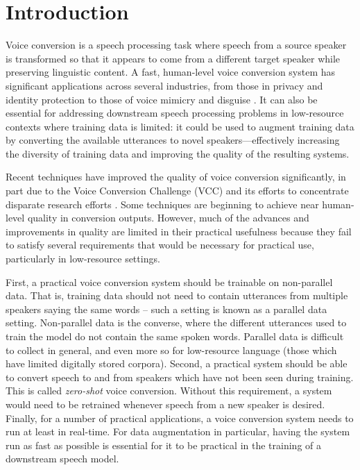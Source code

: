 \section{Introduction}
Voice conversion is a speech processing task where speech from a source speaker is transformed so that it appears to come from a different target speaker while preserving linguistic content.
A fast, human-level voice conversion
system has significant applications across several industries, from those in privacy and identity protection \cite{privacy} to those of voice mimicry and disguise \cite{vc_vc_spk_id,disguise}.
It can also be essential for addressing downstream speech processing problems in low-resource contexts where training data is limited:
it could be used to augment training data by converting the available utterances to novel speakers---effectively increasing the diversity of training data and improving the quality of the resulting systems.

Recent techniques have improved the quality of voice conversion significantly, in part due to the Voice Conversion Challenge (VCC) and its efforts to concentrate disparate research efforts \cite{vcc2020}. 
Some techniques are beginning to achieve near human-level quality in conversion outputs.
However, much of the advances and improvements in quality are limited in their practical usefulness because they fail to satisfy several requirements that would be necessary for practical use, particularly in low-resource settings.

First, a practical voice conversion system should be trainable on non-parallel data.
That is, training data should not need to contain utterances from multiple speakers saying the same words -- such a setting is known as a parallel data setting.
Non-parallel data is the converse, where the different utterances used to train the model do not contain the same spoken words.
Parallel data is difficult to collect in general, and even more so for low-resource language (those which have limited digitally stored corpora). 
Second, a practical system should be able to convert speech to and from speakers which have not been seen during training.
This is called \textit{zero-shot} voice conversion.
Without this requirement, a  system would need to be retrained whenever speech from a new speaker is desired.
Finally, for a number of practical applications, a voice conversion system needs to run at least in real-time. 
For data augmentation in particular, having the system run as fast as possible is essential for it to be practical in the training of a downstream speech model.

